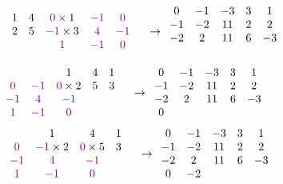 \documentclass[11pt]{article}
\begin{document}
\[
\begin{array}{cccccccccc}
    &&1&4&\textcolor{violet}{0}\times 1&\textcolor{violet}{-1}& \textcolor{violet}{0}\\
    &&2&5&\textcolor{violet}{-1}\times 3&\textcolor{violet}{4}&\textcolor{violet}{-1}\\
    &&&&\textcolor{violet}{1}&\textcolor{violet}{-1}&\textcolor{violet}{0}& \\ 
\end{array}
\rightarrow
\begin{array}{ccccc}
    0 & -1 & -3 & 3&1\\
    -1 & -2 & 11 & 2&2\\
    -2 & 2 & 11 & 6& -3 \\
     &  &  & &  \\
\end{array}
\]
\[
\begin{array}{cccccccccc}
    &&1&4&1&\\
    \textcolor{violet}{0}&\textcolor{violet}{-1}& \textcolor{violet}{0}\times 2 & 5&3\\
    \textcolor{violet}{-1}&\textcolor{violet}{4}&\textcolor{violet}{-1}\\
    \textcolor{violet}{1}&\textcolor{violet}{-1}&\textcolor{violet}{0}& \\ 
\end{array}
\rightarrow
\begin{array}{ccccc}
    0 & -1 & -3 & 3&1\\
    -1 & -2 & 11 & 2&2\\
    -2 & 2 & 11 & 6& -3 \\
    0 &  &  & &  \\
\end{array}
\]
\[
\begin{array}{cccccccccc}
    &&1&4&1&\\
    &\textcolor{violet}{0}&\textcolor{violet}{-1}\times 2& \textcolor{violet}{0}\times 5& 3\\
    &\textcolor{violet}{-1}&\textcolor{violet}{4}&\textcolor{violet}{-1}\\
    &\textcolor{violet}{1}&\textcolor{violet}{-1}&\textcolor{violet}{0}& \\ 
\end{array}
\rightarrow
\begin{array}{ccccc}
    0 & -1 & -3 & 3&1\\
    -1 & -2 & 11 & 2&2\\
    -2 & 2 & 11 & 6& -3 \\
    0 & -2 &  & &  \\
\end{array}
\]
\end{document}
